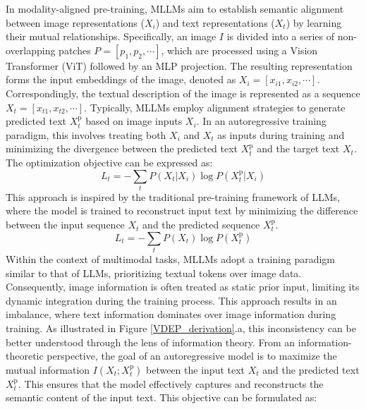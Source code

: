 In modality-aligned pre-training, MLLMs aim to establish semantic alignment between image representations ($X_i$) and text representations ($X_t$) by learning their mutual relationships. Specifically, an image $I$ is divided into a series of non-overlapping patches $P = [p_1, p_2, \cdots]$, which are processed using a Vision Transformer (ViT) followed by an MLP projection. The resulting representation forms the input embeddings of the image, denoted as $X_i = [x_{i1}, x_{i2}, \cdots]$. Correspondingly, the textual description of the image is represented as a sequence $X_t = [x_{t1}, x_{t2}, \cdots]$.
Typically, MLLMs employ alignment strategies to generate predicted text $X_t^{\text{p}}$ based on image inputs $X_i$. In an autoregressive training paradigm, this involves treating both $X_i$ and $X_t$ as inputs during training and minimizing the divergence between the predicted text $X_t^{\text{p}}$ and the target text $X_t$. The optimization objective can be expressed as:
\begin{equation}
L_t = - \sum_{t} P(X_t | X_i) \log P(X_t^{\text{p}} | X_i)
\end{equation}
This approach is inspired by the traditional pre-training framework of LLMs, where the model is trained to reconstruct input text by minimizing the difference between the input sequence $X_t$ and the predicted sequence $X_t^{\text{p}}$.
\begin{equation}
L_t = - \sum_{t} P(X_t) \log P(X_t^{\text{p}})
\end{equation}
Within the context of multimodal tasks, MLLMs adopt a training paradigm similar to that of LLMs, prioritizing textual tokens over image data. Consequently, image information is often treated as static prior input, limiting its dynamic integration during the training process. This approach results in an imbalance, where text information dominates over image information during training.
As illustrated in Figure \ref{VDEP_derivation}.a, this inconsistency can be better understood through the lens of information theory. From an information-theoretic perspective, the goal of an autoregressive model is to maximize the mutual information $I(X_t;X_t^{\text{p}})$ between the input text $X_t$ and the predicted text $X_t^{\text{p}}$. This ensures that the model effectively captures and reconstructs the semantic content of the input text. This objective can be formulated as:
